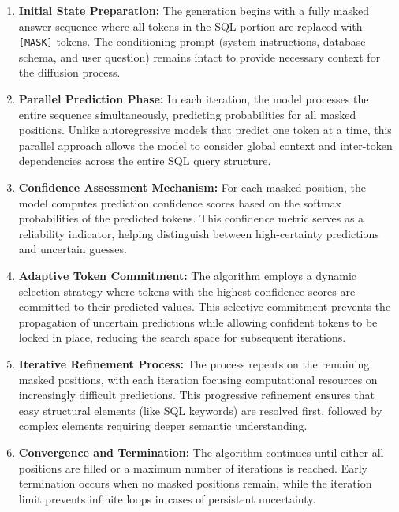 \documentclass[a4paper,12pt]{article}
\begin{document}
\begin{enumerate}
    \item \textbf{Initial State Preparation:} The generation begins with a fully masked answer sequence where all tokens in the SQL portion are replaced with \texttt{[MASK]} tokens. The conditioning prompt (system instructions, database schema, and user question) remains intact to provide necessary context for the diffusion process.
    
    \item \textbf{Parallel Prediction Phase:} In each iteration, the model processes the entire sequence simultaneously, predicting probabilities for all masked positions. Unlike autoregressive models that predict one token at a time, this parallel approach allows the model to consider global context and inter-token dependencies across the entire SQL query structure.
    
    \item \textbf{Confidence Assessment Mechanism:} For each masked position, the model computes prediction confidence scores based on the softmax probabilities of the predicted tokens. This confidence metric serves as a reliability indicator, helping distinguish between high-certainty predictions and uncertain guesses.
    
    \item \textbf{Adaptive Token Commitment:} The algorithm employs a dynamic selection strategy where tokens with the highest confidence scores are committed to their predicted values. This selective commitment prevents the propagation of uncertain predictions while allowing confident tokens to be locked in place, reducing the search space for subsequent iterations.
    
    \item \textbf{Iterative Refinement Process:} The process repeats on the remaining masked positions, with each iteration focusing computational resources on increasingly difficult predictions. This progressive refinement ensures that easy structural elements (like SQL keywords) are resolved first, followed by complex elements requiring deeper semantic understanding.
    
    \item \textbf{Convergence and Termination:} The algorithm continues until either all positions are filled or a maximum number of iterations is reached. Early termination occurs when no masked positions remain, while the iteration limit prevents infinite loops in cases of persistent uncertainty.
\end{enumerate}
\end{document}
